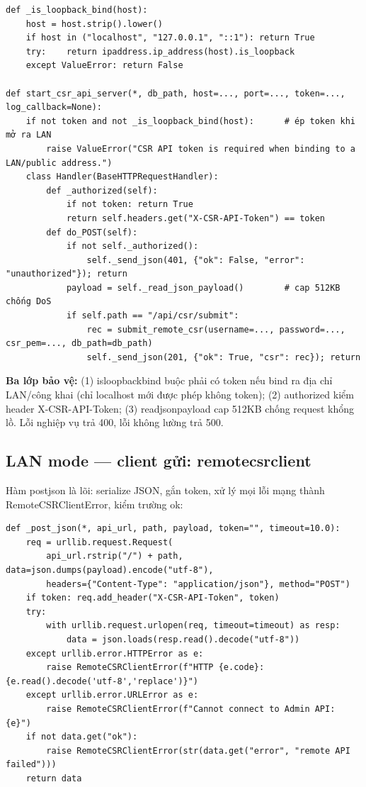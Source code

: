 \documentclass[12pt,a4paper]{article}
\newcommand{\code}[1]{{\ttfamily\small\def\_{\textunderscore\discretionary{}{}{}}#1}}
\begin{document}
\begin{Verbatim}
def _is_loopback_bind(host):
    host = host.strip().lower()
    if host in ("localhost", "127.0.0.1", "::1"): return True
    try:    return ipaddress.ip_address(host).is_loopback
    except ValueError: return False

def start_csr_api_server(*, db_path, host=..., port=..., token=..., log_callback=None):
    if not token and not _is_loopback_bind(host):      # ép token khi mở ra LAN
        raise ValueError("CSR API token is required when binding to a LAN/public address.")
    class Handler(BaseHTTPRequestHandler):
        def _authorized(self):
            if not token: return True
            return self.headers.get("X-CSR-API-Token") == token
        def do_POST(self):
            if not self._authorized():
                self._send_json(401, {"ok": False, "error": "unauthorized"}); return
            payload = self._read_json_payload()        # cap 512KB chống DoS
            if self.path == "/api/csr/submit":
                rec = submit_remote_csr(username=..., password=..., csr_pem=..., db_path=db_path)
                self._send_json(201, {"ok": True, "csr": rec}); return
\end{Verbatim}

\textbf{Ba lớp bảo vệ:} (1) \code{\_is\_loopback\_bind} buộc phải có token nếu
bind ra địa chỉ LAN/công khai (chỉ localhost mới được phép không token); (2)
\code{\_authorized} kiểm header \code{X-CSR-API-Token}; (3) \code{\_read\_json\_payload}
cap 512KB chống request khổng lồ. Lỗi nghiệp vụ trả 400, lỗi không lường trả 500.

\subsection{LAN mode --- client gửi: \code{remote\_csr\_client}}

Hàm \code{\_post\_json} là lõi: serialize JSON, gắn token, xử lý mọi lỗi mạng
thành \code{RemoteCSRClientError}, kiểm trường \code{ok}:

\begin{Verbatim}
def _post_json(*, api_url, path, payload, token="", timeout=10.0):
    req = urllib.request.Request(
        api_url.rstrip("/") + path, data=json.dumps(payload).encode("utf-8"),
        headers={"Content-Type": "application/json"}, method="POST")
    if token: req.add_header("X-CSR-API-Token", token)
    try:
        with urllib.request.urlopen(req, timeout=timeout) as resp:
            data = json.loads(resp.read().decode("utf-8"))
    except urllib.error.HTTPError as e:
        raise RemoteCSRClientError(f"HTTP {e.code}: {e.read().decode('utf-8','replace')}")
    except urllib.error.URLError as e:
        raise RemoteCSRClientError(f"Cannot connect to Admin API: {e}")
    if not data.get("ok"):
        raise RemoteCSRClientError(str(data.get("error", "remote API failed")))
    return data
\end{Verbatim}
\end{document}
